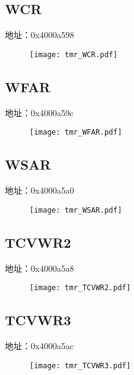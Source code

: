 \subsection{WCR}
\label{tmr-WCR}
地址：0x4000a598
 \begin{figure}[H]
\texttt{[image: tmr\_WCR.pdf]}
\end{figure}

\subsection{WFAR}
\label{tmr-WFAR}
地址：0x4000a59c
 \begin{figure}[H]
\texttt{[image: tmr\_WFAR.pdf]}
\end{figure}

\subsection{WSAR}
\label{tmr-WSAR}
地址：0x4000a5a0
 \begin{figure}[H]
\texttt{[image: tmr\_WSAR.pdf]}
\end{figure}

\subsection{TCVWR2}
\label{tmr-TCVWR2}
地址：0x4000a5a8
 \begin{figure}[H]
\texttt{[image: tmr\_TCVWR2.pdf]}
\end{figure}

\subsection{TCVWR3}
\label{tmr-TCVWR3}
地址：0x4000a5ac
 \begin{figure}[H]
\texttt{[image: tmr\_TCVWR3.pdf]}
\end{figure}

